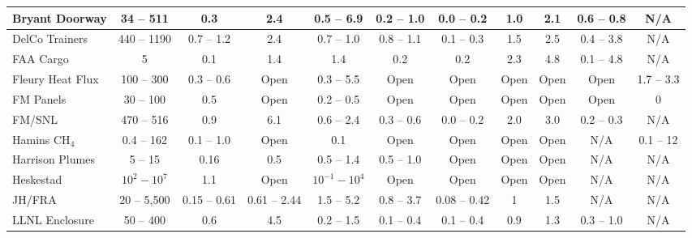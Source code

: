 \begin{landscape}
\begin{longtable}{|l|c|c|c|c|c|c|c|c|c|c|}
Bryant Doorway      & 34 -- 511     & 0.3           & 2.4   & 0.5 -- 6.9        & 0.2 -- 1.0          & 0.0 -- 0.2    & 1.0         & 2.1         & 0.6 -- 0.8            & N/A                   \\ \hline
DelCo Trainers      & 440 -- 1190   & 0.7 -- 1.2    & 2.4   & 0.7 -- 1.0        & 0.8 -- 1.1          & 0.1 -- 0.3    & 1.5         & 2.5         & 0.4 -- 3.8            & N/A                   \\ \hline
FAA Cargo           & 5             & 0.1           & 1.4   & 1.4               & 0.2                 & 0.2           & 2.3         & 4.8         & 0.1 -- 4.8            & N/A                   \\ \hline
Fleury Heat Flux    & 100 -- 300    & 0.3 -- 0.6    & Open  & 0.3 -- 5.5        & Open                & Open          & Open        & Open        & Open                  & 1.7 -- 3.3            \\ \hline
FM Panels           & 30 -- 100     & 0.5           & Open  & 0.2 -- 0.5        & Open                & Open          & Open        & Open        & Open                  & 0                     \\ \hline
FM/SNL              & 470 -- 516    & 0.9           & 6.1   & 0.6 -- 2.4        & 0.3 -- 0.6          & 0.0 -- 0.2    & 2.0         & 3.0         & 0.2 -- 0.3            & N/A                   \\ \hline
Hamins CH$_4$       & 0.4 -- 162    & 0.1 -- 1.0    & Open  & 0.1               & Open                & Open          & Open        & Open        & N/A                   & 0.1 -- 12             \\ \hline
Harrison Plumes     & 5 -- 15       & 0.16          & 0.5   & 0.5 -- 1.4        & 0.5 -- 1.0          & Open          & Open        & Open        & N/A                   & N/A                   \\ \hline
Heskestad           & $10^2-10^7$   & 1.1           & Open  & $10^{-1}-10^4$    & Open                & Open          & Open        & Open        & N/A                   & N/A                   \\ \hline
JH/FRA              & 20 -- 5,500   & 0.15 -- 0.61  & 0.61 -- 2.44 & 1.5 -- 5.2 & 0.8 -- 3.7          & 0.08 -- 0.42  & 1           & 1.5         & N/A                   & N/A                   \\ \hline
LLNL Enclosure      & 50 -- 400     & 0.6           & 4.5   & 0.2 -- 1.5        & 0.1 -- 0.4          & 0.1 -- 0.4    & 0.9         & 1.3         & 0.3 -- 1.0            & N/A                   \\ \hline

\end{longtable}
\end{landscape}
